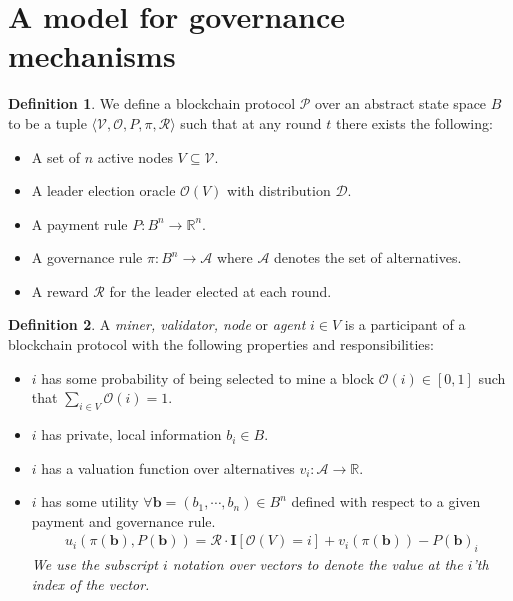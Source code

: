 \documentclass{article}
\theoremstyle{definition}
\newtheorem{definition}{Definition}[section]
\theoremstyle{definition}
\newcounter{protocol}
\begin{document}
\section{A model for governance mechanisms}
\begin{definition}
We define a blockchain protocol $\mathcal{P}$ over an abstract state space $B$ to be a tuple $\langle \mathcal{V}, \mathcal{O}, P, \pi, \mathcal{R}\rangle$ such that at any round $t$ there exists the following:
\begin{itemize}
    \item A set of $n$ active nodes $V\subseteq \mathcal{V}$.
    \item A leader election oracle $\mathcal{O}(V)$ with distribution $\mathcal{D}$.
    \item A payment rule $P:B^n\longrightarrow \mathbb{R}^n$.
    \item A governance rule $\pi:B^n\longrightarrow \mathcal{A}$ where $\mathcal{A}$ denotes the set of alternatives.
    \item A reward $\mathcal{R}$ for the leader elected at each round.
\end{itemize}
\end{definition}

\begin{definition}
A \textit{miner, validator, node} or \textit{agent} $i\in V$ is a participant of a blockchain protocol with the following properties and responsibilities:
\begin{itemize}
    \item $i$ has some probability of being selected to mine a block $\mathcal{O}(i)\in [0,1]$ such that $\sum_{i\in V}\mathcal{O}(i) = 1$.
    \item $i$ has private, local information $b_i\in B$.
    \item $i$ has a valuation function over alternatives $v_i: \mathcal{A}\longrightarrow \mathbb{R}$.
    \item $i$ has some utility $\forall \textbf{b}=(b_1,\cdots,b_n)\in B^n$ defined with respect to a given payment and governance rule.
    \begin{align*}
        u_i(\pi(\textbf{b}),P(\textbf{b})) = \mathcal{R}\cdot\textbf{I}[\mathcal{O}(V)=i] + v_i(\pi(\textbf{b})) - P(\textbf{b})_i
    \end{align*}
    \textit{We use the subscript $i$ notation over vectors to denote the value at the $i$'th index of the vector.}
\end{itemize}
\end{definition}
\end{document}
